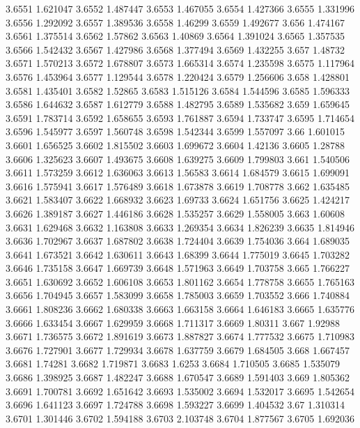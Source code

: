 3.6551  1.621047
3.6552  1.487447
3.6553  1.467055
3.6554  1.427366
3.6555  1.331996
3.6556  1.292092
3.6557  1.389536
3.6558  1.46299
3.6559  1.492677
3.656  1.474167
3.6561  1.375514
3.6562  1.57862
3.6563  1.40869
3.6564  1.391024
3.6565  1.357535
3.6566  1.542432
3.6567  1.427986
3.6568  1.377494
3.6569  1.432255
3.657  1.48732
3.6571  1.570213
3.6572  1.678807
3.6573  1.665314
3.6574  1.235598
3.6575  1.117964
3.6576  1.453964
3.6577  1.129544
3.6578  1.220424
3.6579  1.256606
3.658  1.428801
3.6581  1.435401
3.6582  1.52865
3.6583  1.515126
3.6584  1.544596
3.6585  1.596333
3.6586  1.644632
3.6587  1.612779
3.6588  1.482795
3.6589  1.535682
3.659  1.659645
3.6591  1.783714
3.6592  1.658655
3.6593  1.761887
3.6594  1.733747
3.6595  1.714654
3.6596  1.545977
3.6597  1.560748
3.6598  1.542344
3.6599  1.557097
3.66  1.601015
3.6601  1.656525
3.6602  1.815502
3.6603  1.699672
3.6604  1.42136
3.6605  1.28788
3.6606  1.325623
3.6607  1.493675
3.6608  1.639275
3.6609  1.799803
3.661  1.540506
3.6611  1.573259
3.6612  1.636063
3.6613  1.56583
3.6614  1.684579
3.6615  1.699091
3.6616  1.575941
3.6617  1.576489
3.6618  1.673878
3.6619  1.708778
3.662  1.635485
3.6621  1.583407
3.6622  1.668932
3.6623  1.69733
3.6624  1.651756
3.6625  1.424217
3.6626  1.389187
3.6627  1.446186
3.6628  1.535257
3.6629  1.558005
3.663  1.60608
3.6631  1.629468
3.6632  1.163808
3.6633  1.269354
3.6634  1.826239
3.6635  1.814946
3.6636  1.702967
3.6637  1.687802
3.6638  1.724404
3.6639  1.754036
3.664  1.689035
3.6641  1.673521
3.6642  1.630611
3.6643  1.68399
3.6644  1.775019
3.6645  1.703282
3.6646  1.735158
3.6647  1.669739
3.6648  1.571963
3.6649  1.703758
3.665  1.766227
3.6651  1.630692
3.6652  1.606108
3.6653  1.801162
3.6654  1.778758
3.6655  1.765163
3.6656  1.704945
3.6657  1.583099
3.6658  1.785003
3.6659  1.703552
3.666  1.740884
3.6661  1.808236
3.6662  1.680338
3.6663  1.663158
3.6664  1.646183
3.6665  1.635776
3.6666  1.633454
3.6667  1.629959
3.6668  1.711317
3.6669  1.80311
3.667  1.92988
3.6671  1.736575
3.6672  1.891619
3.6673  1.887827
3.6674  1.777532
3.6675  1.710983
3.6676  1.727901
3.6677  1.729934
3.6678  1.637759
3.6679  1.684505
3.668  1.667457
3.6681  1.74281
3.6682  1.719871
3.6683  1.6253
3.6684  1.710505
3.6685  1.535079
3.6686  1.398925
3.6687  1.482247
3.6688  1.670547
3.6689  1.591403
3.669  1.805362
3.6691  1.700781
3.6692  1.651642
3.6693  1.535002
3.6694  1.532017
3.6695  1.542654
3.6696  1.641123
3.6697  1.724788
3.6698  1.593227
3.6699  1.404532
3.67  1.310314
3.6701  1.301446
3.6702  1.594188
3.6703  2.103748
3.6704  1.877567
3.6705  1.692036
